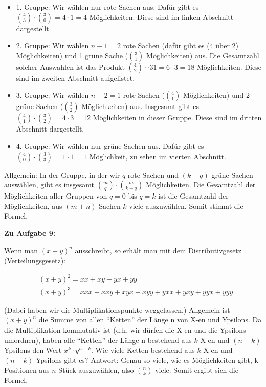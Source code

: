 \documentclass{article}
\begin{document}
\begin{itemize}
  \item 1. Gruppe: Wir wählen nur rote Sachen aus. Dafür gibt es $\binom{4}{3} \cdot \binom{3}{0} = 4 \cdot 1 = 4$ Möglichkeiten. Diese sind im linken Abschnitt dargestellt.
  \item 2. Gruppe: Wir wählen $n-1=2$ rote Sachen (dafür gibt es (4 über 2) Möglichkeiten) und 1 grüne Sache ($\binom{3}{1}$ Möglichkeiten) aus. Die Gesamtzahl solcher Auswahlen ist das Produkt $\binom{4}{2} \cdot \cdot{3}{1} = 6 \cdot 3 = 18$ Möglichkeiten. Diese sind im zweiten Abschnitt aufgelistet.
  \item 3. Gruppe: Wir wählen $n-2=1$ rote Sachen ($\binom{4}{1}$ Möglichkeiten) und 2 grüne Sachen ($\binom{3}{2}$ Möglichkeiten) aus. Insgesamt gibt es $\binom{4}{1} \cdot \binom{3}{2} = 4 \cdot 3 = 12$ Möglichkeiten in dieser Gruppe. Diese sind im dritten Abschnitt dargestellt.
  \item 4. Gruppe: Wir wählen nur grüne Sachen aus. Dafür gibt es $\binom{4}{0} \cdot \binom{3}{3} = 1 \cdot 1 = 1$ Möglichkeit, zu sehen im vierten Abschnitt.
\end{itemize}

Allgemein: In der Gruppe, in der wir $q$ rote Sachen und $(k-q)$ grüne Sachen auswählen, gibt es insgesamt $\binom{m}{q} \cdot \binom{m}{k-q}$ Möglichkeiten. Die Gesamtzahl der Möglichkeiten aller Gruppen von $q=0$ bis $q=k$ ist die Gesamtzahl der Möglichkeiten, aus $(m+n)$ Sachen $k$ viele auszuwählen. Somit stimmt die Formel.


\textbf{Zu Aufgabe 9:}

Wenn man $(x+y)^n$ ausschreibt, so erhält man mit dem Distributivgesetz (Verteilungsgesetz):

\begin{align*}
  & (x+y)^2 = xx + xy + yx + yy \\
  & (x+y)^3 = xxx + xxy + xyx + xyy + yxx + yxy + yyx + yyy
\end{align*}

(Dabei haben wir die Multiplikationspunkte weggelassen.) Allgemein ist $(x+y)^n$ die Summe von allen "`Ketten"' der Länge n von X-en und Ypsilons.
Da die Multiplikation kommutativ ist (d.h. wir dürfen die X-en und die Ypsilons umordnen), haben alle "`Ketten"' der Länge n bestehend aus $k$ X-en und $(n-k)$ Ypsilons den Wert $x^k \cdot y^{n-k}$.
Wie viele Ketten bestehend aus $k$ X-en und $(n-k)$ Ypsilons gibt es? Antwort: Genau so viele, wie es Möglichkeiten gibt, k Positionen aus $n$ Stück auszuwählen, also $\binom{n}{k}$ viele.
Somit ergibt sich die Formel.
\end{document}
